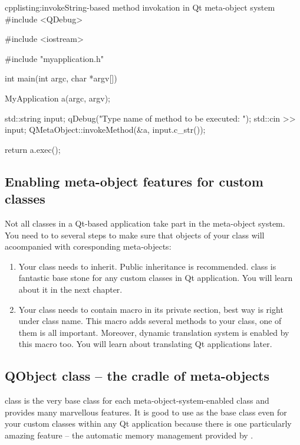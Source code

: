 \begin{fdoccode}{cpp}{listing:invoke}{String-based method invokation in Qt meta-object system}
#include <QDebug>

#include <iostream>

#include "myapplication.h"


int main(int argc, char *argv[]){
    MyApplication a(argc, argv);
    
    std::string input;
    qDebug("Type name of method to be executed: ");
    std::cin >> input;
    QMetaObject::invokeMethod(&a, input.c_str());

    return a.exec();
}
\end{fdoccode}

\subsection{Enabling meta-object features for custom classes}
Not all classes in a Qt-based application take part in the meta-object system. You need to to several steps to make sure that objects of your class will acoompanied with coresponding meta-objects:

\begin{enumerate}
\item Your class needs to inherit. Public inheritance is recommended. class is fantastic base stone for any custom classes in Qt application. You will learn about it in the next chapter.
\item Your class needs to contain macro in its private section, best way is right under class name. This macro adds several methods to your class, one of them is all important. Moreover, dynamic translation system is enabled by this macro too. You will learn about translating Qt applications later.
\end{enumerate}

\subsection{QObject class -- the cradle of meta-objects}
 class is the very base class for each meta-object-system-enabled class and provides many marvellous features. It is good to use as the base class even for your custom classes within any Qt application because there is one particularly amazing feature -- the automatic memory management provided by .

